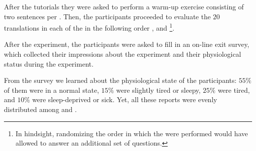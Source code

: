 After the tutorials they were asked to perform a warm-up exercise consisting of %
two sentences per \gamet.  
Then, the participants proceeded to evaluate the $20$ translations in each of the \gamets in the following order \src, \srctgt and \tgt \footnote{In hindsight, randomizing the order in which the \gamets were performed would have allowed to answer an additional set of questions.}.

After the experiment, the participants were asked to fill in an on-line exit survey, which collected their impressions about the experiment and their physiological status during the experiment.


From the survey we learned about the physiological state of the participants: $55\%$ of them were in a normal state, $15\%$ were slightly tired or sleepy, $25\%$ were tired, and $10\%$ were sleep-deprived or sick. Yet, all these reports were evenly distributed among \bils and  \monos.

